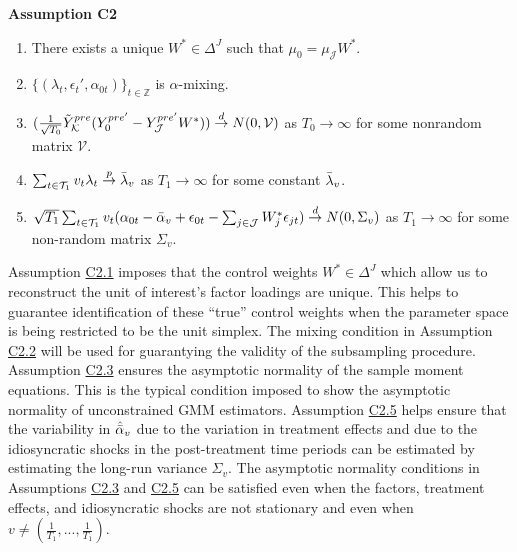 \documentclass{article}
\begin{document}
\textbf{Assumption C2} \label{AC2} 
\begin{enumerate}
   \item There exists a unique $W^* \in \Delta^J$ such that $\mu_0 = \mu_{\mathcal{J}} W^*$.
    \item $\{(\lambda_t, \epsilon_t',\alpha_{0t})\}_{t \in \mathbb{Z}}$ is $\alpha$-mixing.
    \item $(\frac{1}{\sqrt{T_0}} \Tilde{Y}_{\mathcal{K}}^{pre} (Y_{0}^{pre'} - Y_{\mathcal{J}}^{pre'} W^*)) \overset{d}{\rightarrow} N(0, \mathcal{V})$ as $T_0 \rightarrow \infty$ for some nonrandom matrix $\mathcal{V}$.
    \item $\sum_{t \in \mathcal{T}_1} v_t\lambda_t \overset{p}{\rightarrow} \Bar{\lambda}_v$ as $T_1 \rightarrow \infty$ for some constant $\Bar{\lambda}_v$.
    \item $\sqrt{T_1} \sum_{t \in \mathcal{T}_1} v_t(\alpha_{0t} - \Bar{\alpha}_v + \epsilon_{0t} - \sum_{j \in \mathcal{J}} W_j^* \epsilon_{jt} ) \overset{d}{\rightarrow} N(0, \Sigma_v)$ as $T_1 \rightarrow \infty$ for some non-random matrix $\Sigma_v$.

\end{enumerate}

Assumption \hyperref[AC2]{C2.1} imposes that the control weights $W^* \in \Delta^J$ which allow us to reconstruct the unit of interest's factor loadings are unique. This helps to guarantee identification of these “true” control weights when the parameter space is being restricted to be the unit simplex. The mixing condition in Assumption \hyperref[AC2]{C2.2} will be used for guarantying the validity of the subsampling procedure. Assumption \hyperref[AC2]{C2.3} ensures the asymptotic normality of the sample moment equations. This is the typical condition imposed to show the asymptotic normality of unconstrained GMM estimators. Assumption \hyperref[AC2]{C2.5} helps ensure that the variability in $\hat{\Bar{\alpha}}_v$ due to the variation in treatment effects and due to the idiosyncratic shocks in the post-treatment time periods can be estimated by estimating the long-run variance $\Sigma_v$. The asymptotic normality conditions in Assumptions \hyperref[AC2]{C2.3} and \hyperref[AC2]{C2.5} can be satisfied even when the factors, treatment effects, and idiosyncratic shocks are not stationary and even when $v \ne (\frac{1}{T_1},...,\frac{1}{T_1})$. 
\end{document}
